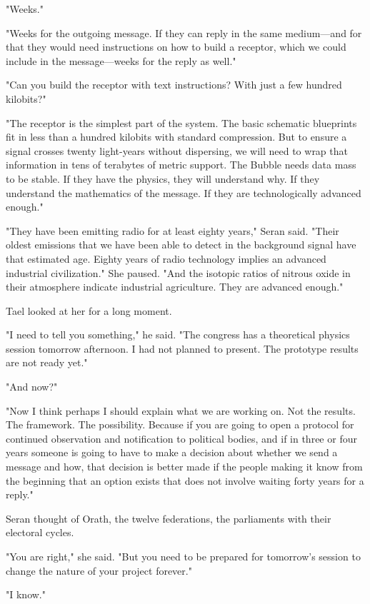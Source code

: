 \documentclass[11pt,a5paper,twoside]{book}
\begin{document}
"Weeks."

"Weeks for the outgoing message. If they can reply in the same medium—and for that they would need instructions on how to build a receptor, which we could include in the message—weeks for the reply as well."

"Can you build the receptor with text instructions? With just a few hundred kilobits?"

"The receptor is the simplest part of the system. The basic schematic blueprints fit in less than a hundred kilobits with standard compression. But to ensure a signal crosses twenty light-years without dispersing, we will need to wrap that information in tens of terabytes of metric support. The Bubble needs data mass to be stable. If they have the physics, they will understand why. If they understand the mathematics of the message. If they are technologically advanced enough."

"They have been emitting radio for at least eighty years," Seran said. "Their oldest emissions that we have been able to detect in the background signal have that estimated age. Eighty years of radio technology implies an advanced industrial civilization." She paused. "And the isotopic ratios of nitrous oxide in their atmosphere indicate industrial agriculture. They are advanced enough."

Tael looked at her for a long moment.

"I need to tell you something," he said. "The congress has a theoretical physics session tomorrow afternoon. I had not planned to present. The prototype results are not ready yet."

"And now?"

"Now I think perhaps I should explain what we are working on. Not the results. The framework. The possibility. Because if you are going to open a protocol for continued observation and notification to political bodies, and if in three or four years someone is going to have to make a decision about whether we send a message and how, that decision is better made if the people making it know from the beginning that an option exists that does not involve waiting forty years for a reply."

Seran thought of Orath, the twelve federations, the parliaments with their electoral cycles.

"You are right," she said. "But you need to be prepared for tomorrow's session to change the nature of your project forever."

"I know."
\end{document}

